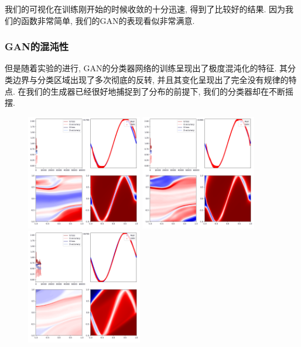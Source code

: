 \documentclass[lang=cn,11pt]{elegantpaper}
\begin{document}
我们的可视化在训练刚开始的时候收敛的十分迅速, 得到了比较好的结果. 因为我们的函数非常简单, 我们的GAN的表现看似非常满意.


\subsubsection{GAN的混沌性}

但是随着实验的进行, GAN的分类器网络的训练呈现出了极度混沌化的特征. 其分类边界与分类区域出现了多次彻底的反转, 并且其变化呈现出了完全没有规律的特点. 在我们的生成器已经很好地捕捉到了分布的前提下, 我们的分类器却在不断摇摆.

\begin{figure}[hbt]
\centering
  \includegraphics[width=0.45\textwidth]{sin_3_1}
  \includegraphics[width=0.45\textwidth]{sin_3_2}\\
  \includegraphics[width=0.45\textwidth]{sin_3_3}

\end{figure}
\end{document}
